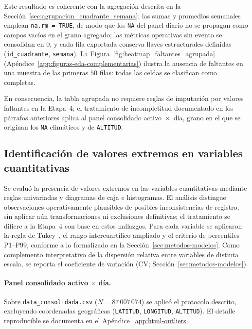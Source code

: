     Este resultado es coherente con la agregación descrita en la Sección~\ref{sec:agrupacion_cuadrante_semana}: las sumas y promedios semanales emplean \texttt{na.rm = TRUE}, de modo que los \texttt{NA} del panel diario no se propagan como campos vacíos en el grano agregado; las métricas operativas sin evento se consolidan en $0$, y cada fila exportada conserva llaves estructurales definidas (\texttt{id\_cuadrante}, \texttt{semana}). La Figura~\ref{fig:heatmap_faltantes_agrupada} (Apéndice~\ref{app:figuras-eda-complementarias}) ilustra la ausencia de faltantes en una muestra de las primeras $50$ filas: todas las celdas se clasifican como completas.
    
    \noindent En consecuencia, la tabla agrupada no requiere reglas de imputación por valores faltantes en la Etapa~4; el tratamiento de incompletitud documentado en los párrafos anteriores aplica al panel consolidado activo~$\times$~día, grano en el que se originan los \texttt{NA} climáticos y de \texttt{ALTITUD}.
    
\subsection{Identificación de valores extremos en variables cuantitativas}
\label{sec:identificacion_valores_extremos}
    Se evaluó la presencia de valores extremos en las variables cuantitativas mediante reglas univariadas y diagramas de caja e histogramas. El análisis distingue observaciones operativamente plausibles de posibles inconsistencias de registro, sin aplicar aún transformaciones ni exclusiones definitivas; el tratamiento se difiere a la Etapa~4 con base en estos hallazgos. Para cada variable se aplicaron la regla de Tukey~\cite{ref50}, el rango intercuartílico ampliado y el criterio de percentiles P1--P99, conforme a lo formalizado en la Sección~\ref{sec:metodos-modelos}. Como complemento interpretativo de la dispersión relativa entre variables de distinta escala, se reporta el coeficiente de variación (CV; Sección~\ref{sec:metodos-modelos}).
    
    \paragraph{Panel consolidado activo $\times$ día.} Sobre \texttt{data\_consolidada.csv} ($N = 87\,007\,074$) se aplicó el protocolo descrito, excluyendo coordenadas geográficas (\texttt{LATITUD}, \texttt{LONGITUD}, \texttt{ALTITUD}). El detalle reproducible se documenta en el Apéndice~\ref{app:html-outliers}.
    
